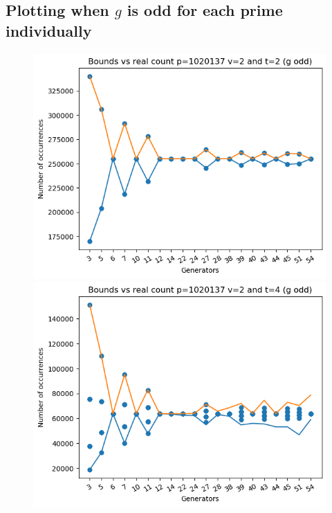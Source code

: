 \documentclass{article}
\begin{document}
\subsection{Plotting when $g$ is odd for each prime individually}
\begin{figure}[H]
    \begin{minipage}{.49\textwidth}
            \centering
            \includegraphics[width=\textwidth]{../plots/tuples_figures/1020137v2godd/test_p1020137_v2_t2_g_odd.png}
            \includegraphics[width=\textwidth]{../plots/tuples_figures/1020137v2godd/test_p1020137_v2_t4_g_odd.png}

\end{minipage}
\end{figure}
\end{document}
